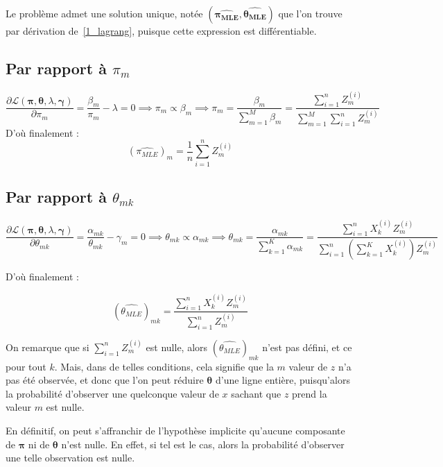 \documentclass[12pt,a4paper,onecolumn]{article}
\begin{document}
Le problème admet une solution unique, notée \( (\bm{\widehat{\pi_{MLE}}}, \bm{\widehat{\theta_{MLE}}}) \) que l'on trouve par dérivation de~\eqref{1_lagrang}, puisque cette expression est différentiable.

\subsection{Par rapport à \protect\(\pi_m\)}

\[
	\frac{\partial \mathcal{L}(\bm{\pi}, \bm{\theta}, \lambda, \bm{\gamma})}{\partial \pi_m} = \frac{\beta_m}{\pi_m} - \lambda = 0
	\implies \pi_m \propto \beta_m
	\implies \pi_m = \frac{\beta_m}{\sum_{m=1}^M \beta_m}= \frac{\sum_{i = 1}^n {Z_m^{(i)}}}{\sum_{m=1}^M \sum_{i = 1}^n {Z_m^{(i)}}}
\]
D'où finalement :
\begin{equation}
	\left(\widehat{\pi_{MLE}}\right)_m = \frac{1}{n} \sum_{i = 1}^n {Z_m^{(i)}}
	\label{1_pi}
\end{equation}

\subsection{Par rapport à \protect\(\theta_{mk}\)}

\[
	\frac{\partial \mathcal{L}(\bm{\pi}, \bm{\theta}, \lambda, \bm{\gamma})}{\partial \theta_{mk}} = \frac{\alpha_{mk}}{\theta_{mk}} - \gamma_m = 0 \implies \theta_{mk} \propto \alpha_{mk}
	\implies \theta_{mk} = \frac{\alpha_{mk}}{\sum_{k = 1}^K \alpha_{mk}} = \frac{\sum_{i = 1}^n X_k^{(i)} Z_m^{(i)}}{\sum_{i = 1}^n \left(\sum_{k=1}^K X_k^{(i)}\right) Z_m^{(i)}}
\]

D'où finalement :

\begin{equation}
	\left( \widehat{{\theta_{MLE}}} \right)_{mk} = \frac{\sum_{i = 1}^n X_k^{(i)} Z_m^{(i)}}{\sum_{i = 1}^n Z_m^{(i)}}
\end{equation}

On remarque que si \( \sum_{i = 1}^n Z_m^{(i)} \) est nulle, alors \( \left(\widehat{{\theta_{MLE}}}\right)_{mk} \) n'est pas défini, et ce pour tout \( k\). Mais, dans de telles conditions, cela signifie que la \( m \) valeur de \( z \) n'a pas été observée, et donc que l'on peut réduire \( \bm{\theta} \) d'une ligne entière, puisqu'alors la probabilité d'observer une quelconque valeur de \( x\) sachant que \( z\) prend la valeur \( m\) est nulle.

En définitif, on peut s'affranchir de l'hypothèse implicite qu'aucune composante de \(\bm{\pi}\) ni de \(\bm{\theta}\) n'est nulle. En effet, si tel est le cas, alors la probabilité d'observer une telle observation est nulle.
\end{document}
